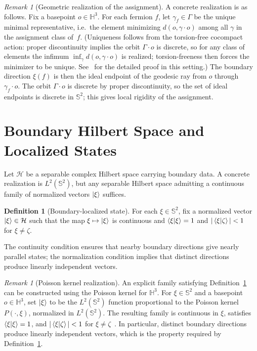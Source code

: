 \documentclass[12pt]{article}
\theoremstyle{definition}
\newtheorem{definition}[theorem]{Definition}
\theoremstyle{remark}
\newtheorem{remark}[theorem]{Remark}
\newcommand{\Hthree}{\mathbb{H}^3}
\newcommand{\Sphere}{\mathbb{S}^2}
\newcommand{\GammaG}{\Gamma}
\newcommand{\calH}{\mathcal{H}}
\begin{document}
\begin{remark}[Geometric realization of the assignment]
A concrete realization is as follows.
Fix a basepoint $o\in\Hthree$.
For each fermion $f$, let $\gamma_f\in\GammaG$ be the unique
minimal representative, i.e.\ the element minimizing
$d(o,\gamma\cdot o)$ among all $\gamma$ in the assignment class of~$f$.
(Uniqueness follows from the torsion-free cocompact action:
proper discontinuity implies the orbit $\GammaG\cdot o$ is discrete,
so for any class of elements the infimum $\inf_\gamma d(o,\gamma\cdot o)$
is realized; torsion-freeness then forces the minimizer to be unique.
See~\cite{Gentry:lattice} for the detailed proof in this setting.)
The boundary direction $\xi(f)$ is then the ideal endpoint of the
geodesic ray from $o$ through $\gamma_f\cdot o$.
The orbit $\GammaG\cdot o$ is discrete by proper discontinuity,
so the set of ideal endpoints is discrete in $\Sphere$;
this gives local rigidity of the assignment.
\end{remark}

\section{Boundary Hilbert Space and Localized States}
\label{sec:states}

Let $\calH$ be a separable complex Hilbert space carrying boundary data.
A concrete realization is $L^2(\Sphere)$, but any separable Hilbert space
admitting a continuous family of normalized vectors $\ket{\xi}$ suffices.

\begin{definition}[Boundary-localized state]\label{def:localized}
For each $\xi\in\Sphere$, fix a normalized vector $\ket{\xi}\in\calH$
such that the map $\xi\mapsto\ket{\xi}$ is continuous and
$\braket{\xi|\xi}=1$ and $|\braket{\xi|\zeta}|<1$ for $\xi\neq\zeta$.
\end{definition}

The continuity condition ensures that nearby boundary directions give
nearly parallel states; the normalization condition implies that distinct
directions produce linearly independent vectors.

\begin{remark}[Poisson kernel realization]
An explicit family satisfying Definition~\ref{def:localized} can be
constructed using the Poisson kernel for $\Hthree$.
For $\xi\in\Sphere$ and a basepoint $o\in\Hthree$, set
$\ket{\xi}$ to be the $L^2(\Sphere)$ function proportional to the
Poisson kernel $P(\cdot,\xi)$, normalized in $L^2(\Sphere)$.
The resulting family is continuous in $\xi$, satisfies
$\braket{\xi|\xi}=1$, and $|\braket{\xi|\zeta}|<1$ for $\xi\neq\zeta$~\cite{ratcliffe}.
In particular, distinct boundary directions produce linearly independent
vectors, which is the property required by Definition~\ref{def:localized}.
\end{remark}
\end{document}
